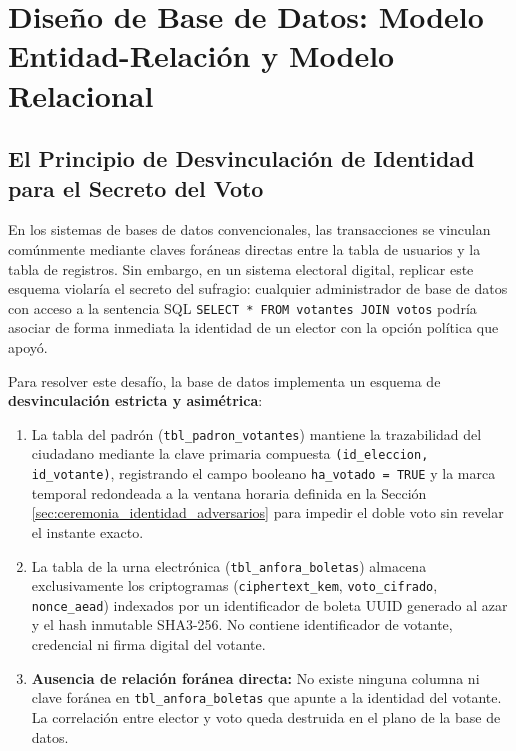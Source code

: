 \section{Diseño de Base de Datos: Modelo Entidad-Relación y Modelo Relacional}
\label{sec:diseno_bbdd}

\subsection{El Principio de Desvinculación de Identidad para el Secreto del Voto}

En los sistemas de bases de datos convencionales, las transacciones se vinculan comúnmente mediante claves foráneas directas entre la tabla de usuarios y la tabla de registros. Sin embargo, en un sistema electoral digital, replicar este esquema violaría el secreto del sufragio: cualquier administrador de base de datos con acceso a la sentencia SQL \texttt{SELECT * FROM votantes JOIN votos} podría asociar de forma inmediata la identidad de un elector con la opción política que apoyó.

Para resolver este desafío, la base de datos implementa un esquema de \textbf{desvinculación estricta y asimétrica}:
\begin{enumerate}
	\item La tabla del padrón (\texttt{tbl\_padron\_votantes}) mantiene la trazabilidad del ciudadano mediante la clave primaria compuesta \texttt{(id\_eleccion, id\_votante)}, registrando el campo booleano \texttt{ha\_votado = TRUE} y la marca temporal redondeada a la ventana horaria definida en la Sección \ref{sec:ceremonia_identidad_adversarios} para impedir el doble voto sin revelar el instante exacto.
	\item La tabla de la urna electrónica (\texttt{tbl\_anfora\_boletas}) almacena exclusivamente los criptogramas (\texttt{ciphertext\_kem}, \texttt{voto\_cifrado}, \texttt{nonce\_aead}) indexados por un identificador de boleta UUID generado al azar y el hash inmutable SHA3-256. No contiene identificador de votante, credencial ni firma digital del votante.
	\item \textbf{Ausencia de relación foránea directa:} No existe ninguna columna ni clave foránea en \texttt{tbl\_anfora\_boletas} que apunte a la identidad del votante. La correlación entre elector y voto queda destruida en el plano de la base de datos.
\end{enumerate}


